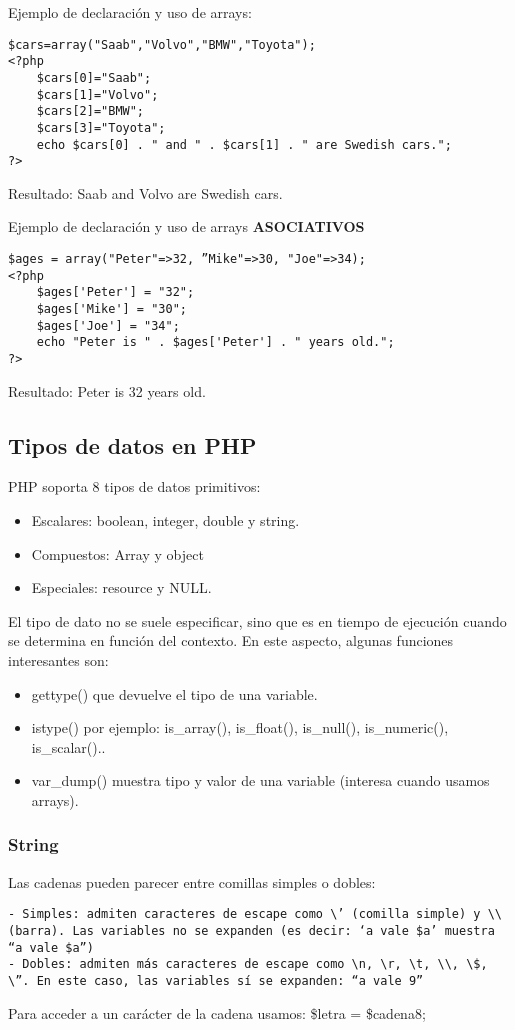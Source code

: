 \documentclass{apuntes}
\begin{document}
Ejemplo de declaración y uso de arrays:
\begin{verbatim}
$cars=array("Saab","Volvo","BMW","Toyota");
<?php
    $cars[0]="Saab";
    $cars[1]="Volvo";
    $cars[2]="BMW";
    $cars[3]="Toyota";
    echo $cars[0] . " and " . $cars[1] . " are Swedish cars.";
?>
\end{verbatim}
Resultado: Saab and Volvo are Swedish cars.

Ejemplo de declaración y uso de arrays \textbf{ASOCIATIVOS}
\begin{verbatim}
$ages = array("Peter"=>32, ”Mike"=>30, "Joe"=>34);
<?php
    $ages['Peter'] = "32";
    $ages['Mike'] = "30";
    $ages['Joe'] = "34";
    echo "Peter is " . $ages['Peter'] . " years old.";
?>
\end{verbatim}
Resultado: Peter is 32 years old.

\subsection{Tipos de datos en PHP}
PHP soporta 8 tipos de datos primitivos:
\begin{itemize}
\item Escalares: boolean, integer, double y string.
\item Compuestos: Array y object
\item Especiales: resource y NULL.
\end{itemize}
El tipo de dato no se suele especificar, sino que es en tiempo de ejecución cuando se determina en función del contexto. En este aspecto, algunas funciones interesantes son:
\begin{itemize}
\item gettype() que devuelve el tipo de una variable.
\item istype() por ejemplo: is\_array(), is\_float(), is\_null(), is\_numeric(), is\_scalar()..
\item var\_dump() muestra tipo y valor de una variable (interesa cuando usamos arrays).
\end{itemize}

\subsubsection{String}
Las cadenas pueden parecer entre comillas simples o dobles:
\begin{verbatim}
- Simples: admiten caracteres de escape como \’ (comilla simple) y \\ (barra). Las variables no se expanden (es decir: ‘a vale $a’ muestra “a vale $a”)
- Dobles: admiten más caracteres de escape como \n, \r, \t, \\, \$, \”. En este caso, las variables sí se expanden: “a vale 9”
\end{verbatim}
Para acceder a un carácter de la cadena usamos: \$letra = \$cadena{8};
\end{document}
